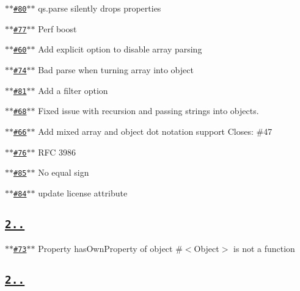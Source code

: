 \begin{DoxyItemize}
\item \href{https://github.com/ljharb/qs/issues/80}{\tt $\ast$$\ast$\#80$\ast$$\ast$} qs.\+parse silently drops properties
\item \href{https://github.com/ljharb/qs/issues/77}{\tt $\ast$$\ast$\#77$\ast$$\ast$} Perf boost
\item \href{https://github.com/ljharb/qs/issues/60}{\tt $\ast$$\ast$\#60$\ast$$\ast$} Add explicit option to disable array parsing
\item \href{https://github.com/ljharb/qs/issues/74}{\tt $\ast$$\ast$\#74$\ast$$\ast$} Bad parse when turning array into object
\item \href{https://github.com/ljharb/qs/issues/81}{\tt $\ast$$\ast$\#81$\ast$$\ast$} Add a {\ttfamily filter} option
\item \href{https://github.com/ljharb/qs/issues/68}{\tt $\ast$$\ast$\#68$\ast$$\ast$} Fixed issue with recursion and passing strings into objects.
\item \href{https://github.com/ljharb/qs/issues/66}{\tt $\ast$$\ast$\#66$\ast$$\ast$} Add mixed array and object dot notation support Closes\+: \#47
\item \href{https://github.com/ljharb/qs/issues/76}{\tt $\ast$$\ast$\#76$\ast$$\ast$} R\+FC 3986
\item \href{https://github.com/ljharb/qs/issues/85}{\tt $\ast$$\ast$\#85$\ast$$\ast$} No equal sign
\item \href{https://github.com/ljharb/qs/issues/84}{\tt $\ast$$\ast$\#84$\ast$$\ast$} update license attribute
\end{DoxyItemize}

\subsection*{\href{https://github.com/ljharb/qs/issues?milestone=20&state=closed}{\tt {\bfseries 2..}}}


\begin{DoxyItemize}
\item \href{https://github.com/ljharb/qs/issues/73}{\tt $\ast$$\ast$\#73$\ast$$\ast$} Property \textquotesingle{}has\+Own\+Property\textquotesingle{} of object \#$<$\+Object$>$ is not a function
\end{DoxyItemize}

\subsection*{\href{https://github.com/ljharb/qs/issues?milestone=19&state=closed}{\tt {\bfseries 2..}}}


